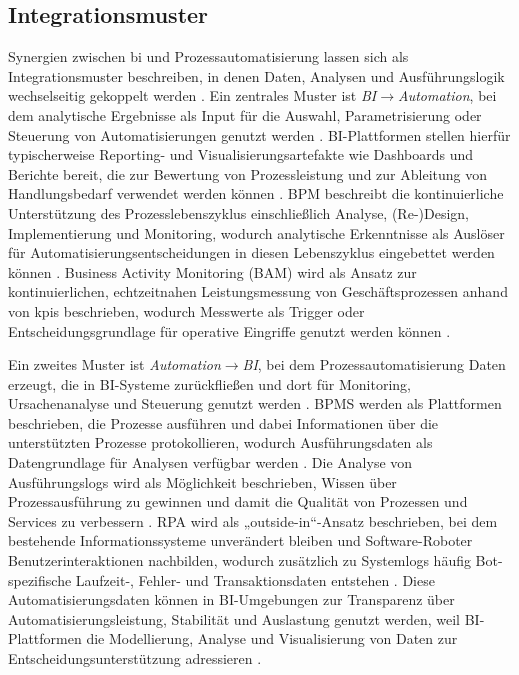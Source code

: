 \subsection{Integrationsmuster}
Synergien zwischen \gls{bi} und Prozessautomatisierung lassen sich als Integrationsmuster beschreiben, in denen Daten, Analysen und Ausführungslogik wechselseitig gekoppelt werden \cite{DumasEtAl2013,GartnerABIArticle}. 
Ein zentrales Muster ist \emph{BI$\rightarrow$Automation}, bei dem analytische Ergebnisse als Input für die Auswahl, Parametrisierung oder Steuerung von Automatisierungen genutzt werden \cite{GartnerABIArticle,DumasEtAl2013}. 
BI-Plattformen stellen hierfür typischerweise Reporting- und Visualisierungsartefakte wie Dashboards und Berichte bereit, die zur Bewertung von Prozessleistung und zur Ableitung von Handlungsbedarf verwendet werden können \cite{GartnerABIArticle}. 
BPM beschreibt die kontinuierliche Unterstützung des Prozesslebenszyklus einschließlich Analyse, (Re-)Design, Implementierung und Monitoring, wodurch analytische Erkenntnisse als Auslöser für Automatisierungsentscheidungen in diesen Lebenszyklus eingebettet werden können \cite{DumasEtAl2013}. 
Business Activity Monitoring (BAM) wird als Ansatz zur kontinuierlichen, echtzeitnahen Leistungsmessung von Geschäftsprozessen anhand von \glspl{kpi} beschrieben, wodurch Messwerte als Trigger oder Entscheidungsgrundlage für operative Eingriffe genutzt werden können \cite{Wetzstein2008BAM}. 

Ein zweites Muster ist \emph{Automation$\rightarrow$BI}, bei dem Prozessautomatisierung Daten erzeugt, die in BI-Systeme zurückfließen und dort für Monitoring, Ursachenanalyse und Steuerung genutzt werden \cite{Grigori2004BPI,ISO27001}. 
BPMS werden als Plattformen beschrieben, die Prozesse ausführen und dabei Informationen über die unterstützten Prozesse protokollieren, wodurch Ausführungsdaten als Datengrundlage für Analysen verfügbar werden \cite{Grigori2004BPI}. 
Die Analyse von Ausführungslogs wird als Möglichkeit beschrieben, Wissen über Prozessausführung zu gewinnen und damit die Qualität von Prozessen und Services zu verbessern \cite{Grigori2004BPI}. 
RPA wird als „outside-in“-Ansatz beschrieben, bei dem bestehende Informationssysteme unverändert bleiben und Software-Roboter Benutzerinteraktionen nachbilden, wodurch zusätzlich zu Systemlogs häufig Bot-spezifische Laufzeit-, Fehler- und Transaktionsdaten entstehen \cite{AalstBichlerHeinzl2018RPA}. 
Diese Automatisierungsdaten können in BI-Umgebungen zur Transparenz über Automatisierungsleistung, Stabilität und Auslastung genutzt werden, weil BI-Plattformen die Modellierung, Analyse und Visualisierung von Daten zur Entscheidungsunterstützung adressieren \cite{GartnerABIPlatformsReview}. 

